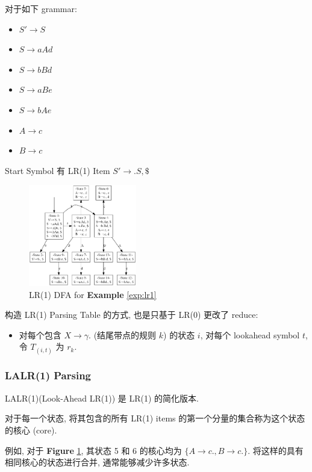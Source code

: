 \begin{example}\label{exp:lr1}
    对于如下 grammar:
    \begin{itemize}
        \item $S'\to S$
        \item $S \to aAd$
        \item $S \to bBd$
        \item $S \to aBe$
        \item $S \to bAe$
        \item $A \to c$
        \item $B \to c$
    \end{itemize}
    Start Symbol 有 LR(1) Item $S'\to .S, \$ $
    
    \begin{figure}[!htb]
        \centering
        \includegraphics[width=0.42\textwidth]{pic/CP3/explr1dfa.png}
        \caption{LR(1) DFA for \textbf{Example} \ref{exp:lr1}}
        \label{fig:explr1}
    \end{figure}
    
\end{example}

构造 LR(1) Parsing Table 的方式, 也是只基于 LR(0) 更改了 reduce:
\begin{itemize}
    \item 对每个包含 $X\to \gamma.$ (结尾带点的规则 $k$) 的状态 $i$, 对每个 lookahead symbol $t$, 令 $T_{(i,t)}$ 为 $r_k$.
\end{itemize}

\subsubsection{LALR(1) Parsing}
LALR(1)(Look-Ahead LR(1)) 是 LR(1) 的简化版本. 

对于每一个状态, 将其包含的所有 LR(1) items 的第一个分量的集合称为这个状态的核心 (core). 

例如, 对于 \textbf{Figure} \ref{fig:explr1}, 其状态 5 和 6 的核心均为 $\{A\to c., B\to c.\}$. 将这样的具有相同核心的状态进行合并, 通常能够减少许多状态. 

